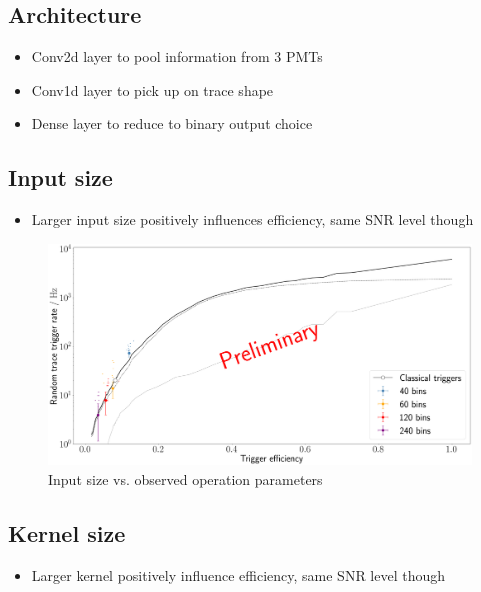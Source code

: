 \subsection{Architecture}
\label{ssec:cnn-architecture}

\begin{itemize}
	\item Conv2d layer to pool information from 3 PMTs
	\item Conv1d layer to pick up on trace shape
	\item Dense layer to reduce to binary output choice
\end{itemize}


\subsection{Input size}
\label{ssec:input-size}

\begin{itemize}
	\item Larger input size positively influences efficiency, same SNR level though
\end{itemize}

\begin{figure}
	\centering
	\includegraphics[width=1\textwidth]{./plots/prelim/input_size.png}
	\caption{Input size vs. observed operation parameters}
\end{figure}

\subsection{Kernel size}
\label{ssec:kernel-size}

\begin{itemize}
	\item Larger kernel positively influence efficiency, same SNR level though
\end{itemize}

